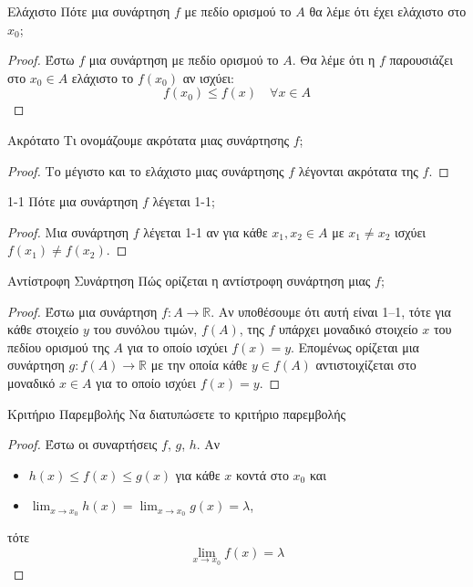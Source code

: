 \documentclass[a4paper, 12pt]{article}
\begin{document}
\begin{theorem}{Ελάχιστο}
  Πότε μια συνάρτηση $f$ με πεδίο ορισμού το $A$ θα λέμε ότι έχει ελάχιστο στο $x_0$;
\end{theorem}
\begin{proof}
  Έστω $f$ μια συνάρτηση με πεδίο ορισμού το $A$. Θα λέμε ότι η $f$ παρουσιάζει στο $x_0\in Α$ ελάχιστο το $f(x_0)$ αν ισχύει:
  $$f(x_0) \leq f(x) \quad \forall x \in A$$
\end{proof}

\begin{theorem}{Ακρότατο}
  Τι ονομάζουμε ακρότατα μιας συνάρτησης $f$;
\end{theorem}
\begin{proof}
  Το μέγιστο και το ελάχιστο μιας συνάρτησης $f$ λέγονται ακρότατα της $f$.
\end{proof}

\begin{theorem}{1-1}
  Πότε μια συνάρτηση $f$ λέγεται 1-1;
\end{theorem}
\begin{proof}
  Μια συνάρτηση $f$ λέγεται 1-1 αν για κάθε $x_1, x_2 \in A$ με $x_1 \neq x_2$ ισχύει $f(x_1) \neq f(x_2)$.
\end{proof}

\begin{theorem}{Αντίστροφη Συνάρτηση}
  Πώς ορίζεται η αντίστροφη συνάρτηση μιας $f$;
\end{theorem}
\begin{proof}
  Έστω μια συνάρτηση $f : A \to \mathbb{R}$. Αν υποθέσουμε ότι αυτή είναι 1–1, τότε για κάθε στοιχείο $y$ του συνόλου τιμών, $f(A)$, της $f$ υπάρχει μοναδικό στοιχείο $x$ του πεδίου ορισμού της $Α$ για το οποίο ισχύει $f(x) = y$. Επομένως ορίζεται μια συνάρτηση
  $g : f ( A) \to \mathbb{R}$ με την οποία κάθε $y \in f ( A)$ αντιστοιχίζεται στο μοναδικό $x \in A$ για το οποίο ισχύει $f(x) = y$.
\end{proof}

\begin{theorem}{Κριτήριο Παρεμβολής}
  Να διατυπώσετε το κριτήριο παρεμβολής
\end{theorem}
\begin{proof}
  Έστω οι συναρτήσεις $f$, $g$, $h$. Αν
  \begin{itemize}
    \item $h(x) \leq f(x) \leq g(x)$ για κάθε $x$ κοντά στο $x_0$ και
    \item $\lim_{x \to x_0} h(x) = \lim_{x \to x_0} g(x) = λ$,
  \end{itemize}
  τότε
  $$\lim_{x \to x_0} f(x) = λ$$
\end{proof}
\end{document}
